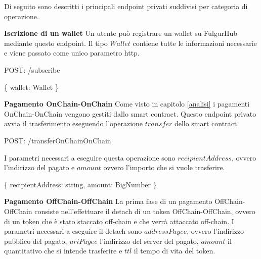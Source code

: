 \documentclass[12pt,italian,]{book}
\newenvironment{Shaded}{}{}
\newcommand{\DataTypeTok}[1]{\textcolor[rgb]{0.56,0.13,0.00}{#1}}
\newcommand{\NormalTok}[1]{#1}
\newcommand{\OperatorTok}[1]{\textcolor[rgb]{0.40,0.40,0.40}{#1}}
\newcommand{\SpecialStringTok}[1]{\textcolor[rgb]{0.73,0.40,0.53}{#1}}
\begin{document}
Di seguito sono descritti i principali endpoint privati suddivisi per categoria di operazione.

\textbf{\textbf{Iscrizione di un wallet}} Un utente può registrare un wallet su FulgurHub mediante questo endpoint. Il tipo \(Wallet\) contiene tutte le informazioni necessarie e viene passato come unico parametro http.

\begin{Shaded}
\begin{Highlighting}[]
\NormalTok{POST}\OperatorTok{:} \SpecialStringTok{/subscribe}
\end{Highlighting}
\end{Shaded}

\begin{Shaded}
\begin{Highlighting}[]
\OperatorTok{\{}
  \DataTypeTok{wallet}\OperatorTok{:}\NormalTok{ Wallet}
\OperatorTok{\}}
\end{Highlighting}
\end{Shaded}

\textbf{\textbf{Pagamento OnChain-OnChain}} Come visto in capitolo \ref{analisi} i pagamenti OnChain-OnChain vengono gestiti dallo smart contract. Questo endpoint privato avvia il trasferimento eseguendo l'operazione \(transfer\) dello smart contract.

\begin{Shaded}
\begin{Highlighting}[]
\NormalTok{POST}\OperatorTok{:} \SpecialStringTok{/transferOnChainOnChain}
\end{Highlighting}
\end{Shaded}

I parametri necessari a eseguire questa operazione sono \(recipientAddress\), ovvero l'indirizzo del pagato e \(amount\) ovvero l'importo che si vuole trasferire.

\begin{Shaded}
\begin{Highlighting}[]
\OperatorTok{\{}
    \DataTypeTok{recipientAddress}\OperatorTok{:}\NormalTok{ string}\OperatorTok{,}
    \DataTypeTok{amount}\OperatorTok{:}\NormalTok{ BigNumber}
\OperatorTok{\}}
\end{Highlighting}
\end{Shaded}

\textbf{\textbf{Pagamento OffChain-OffChain}} La prima fase di un pagamento OffChain-OffChain consiste nell'effettuare il detach di un token OffChain-OffChain, ovvero di un token che è stato staccato off-chain e che verrà attaccato off-chain. I parametri necessari a eseguire il detach sono \(addressPayee\), ovvero l'indirizzo pubblico del pagato, \(uriPayee\) l'indirizzo del server del pagato, \(amount\) il quantitativo che si intende trasferire e \(ttl\) il tempo di vita del token.
\end{document}
